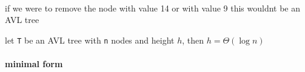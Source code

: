 \documentclass[a4paper,12pt]{article}
\begin{document}
\begin{center}

\end{center}\\[0pt]

if we were to remove the node with value 14 or with value 9 this wouldnt be an AVL tree\\[0pt]

\begin{lemma}
let \texttt{T} be an AVL tree with \texttt{n} nodes and height \(h\), then \(h = \Theta(\log n)\)\\[0pt]
\end{lemma}
\paragraph{minimal form}
\label{sec:orgd4eefed}
\end{document}
